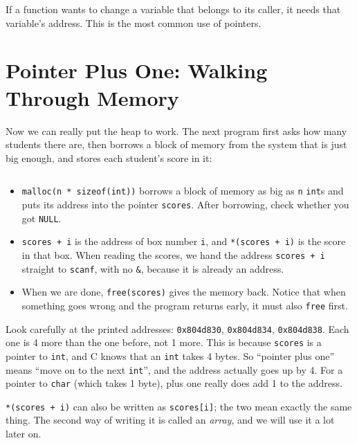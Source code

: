 If a function wants to change a variable that belongs to its caller, it needs that variable's address. This is the most common use of pointers.

\section{Pointer Plus One: Walking Through Memory}
\label{sec:heap-pointer}

Now we can really put the heap to work. The next program first asks how many students there are, then borrows a block of memory from the system that is just big enough, and stores each student's score in it:


\inputminted[linenos=false]{text}{code/en/ch04/out/heap.txt}

\begin{itemize}
  \item \texttt{malloc(n * sizeof(int))} borrows a block of memory as big as \texttt{n} \texttt{int}s and puts its address into the pointer \texttt{scores}. After borrowing, check whether you got \texttt{NULL}.
  \item \texttt{scores + i} is the address of box number \texttt{i}, and \texttt{*(scores + i)} is the score in that box. When reading the scores, we hand the address \texttt{scores + i} straight to \texttt{scanf}, with no \texttt{\&}, because it is already an address.
  \item When we are done, \texttt{free(scores)} gives the memory back. Notice that when something goes wrong and the program returns early, it must also \texttt{free} first.
\end{itemize}

Look carefully at the printed addresses: \texttt{0x804d830}, \texttt{0x804d834}, \texttt{0x804d838}. Each one is 4 more than the one before, not 1 more. This is because \texttt{scores} is a pointer to \texttt{int}, and C knows that an \texttt{int} takes 4 bytes. So ``pointer plus one'' means ``move on to the next \texttt{int}'', and the address actually goes up by 4. For a pointer to \texttt{char} (which takes 1 byte), plus one really does add 1 to the address.

\texttt{*(scores + i)} can also be written as \texttt{scores[i]}; the two mean exactly the same thing. The second way of writing it is called an \emph{array}, and we will use it a lot later on.

